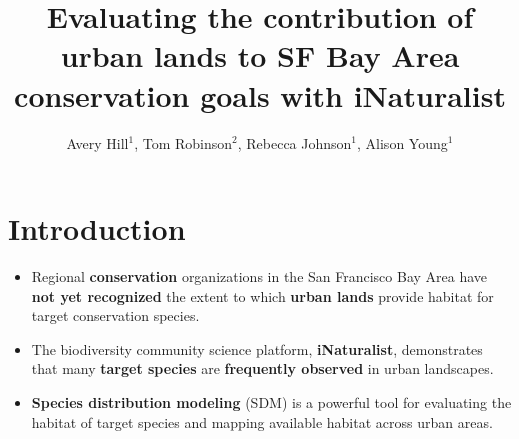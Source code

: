 \documentclass[a0paper,fleqn]{betterposter}
\begin{document}
{{}

}{

\title{Evaluating the contribution of urban lands to SF Bay Area conservation goals with iNaturalist}
\author{Avery Hill$^1$, Tom Robinson$^2$, Rebecca Johnson$^1$, Alison Young$^1$}



\section{Introduction}

\vspace{-2cm}
\begin{itemize}
\item Regional \textbf{conservation} organizations in the San Francisco Bay Area have \textbf{not yet recognized} the extent to which \textbf{urban lands} provide habitat for target conservation species.
\item The biodiversity community science platform, \textbf{iNaturalist}, demonstrates that many \textbf{target species} are \textbf{frequently observed} in urban landscapes.
\item \textbf{Species distribution modeling} (SDM) is a powerful tool for evaluating the habitat of target species and mapping available habitat across urban areas.
\end{itemize}

}
\end{document}
